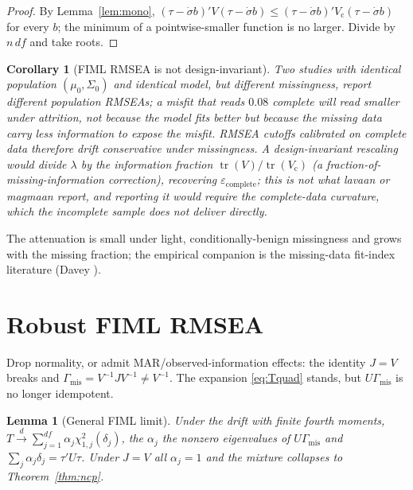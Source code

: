 \documentclass[11pt]{article}
\newcommand{\tr}{\operatorname{tr}}
\newcommand{\Gmis}{\Gamma_{\mathrm{mis}}}
\newcommand{\dto}{\xrightarrow{d}}
\theoremstyle{plain}
\newtheorem{lemma}{Lemma}
\newtheorem{corollary}{Corollary}
\theoremstyle{remark}
\begin{document}
\begin{proof}
By Lemma~\ref{lem:mono}, $(\tau-\dot\sigma b)'V(\tau-\dot\sigma b)\le
(\tau-\dot\sigma b)'V_{\mathrm c}(\tau-\dot\sigma b)$ for every $b$; the minimum
of a pointwise-smaller function is no larger. Divide by $n\,df$ and take roots.
\end{proof}

\begin{corollary}[FIML RMSEA is not design-invariant]\label{cor:noninvariant}
Two studies with identical population $(\mu_0,\Sigma_0)$ and identical model, but
different missingness, report different population RMSEAs; a misfit that reads
$0.08$ complete will read smaller under attrition, not because the model fits
better but because the missing data carry less information to expose the misfit.
RMSEA cutoffs calibrated on complete data therefore drift conservative under
missingness. A design-invariant rescaling would divide $\lambda$ by the
information fraction $\tr(V)/\tr(V_{\mathrm c})$ (a fraction-of-missing-information
correction), recovering $\varepsilon_{\mathrm{complete}}$; this is not what
lavaan or magmaan report, and reporting it would require the complete-data
curvature, which the incomplete sample does not deliver directly.
\end{corollary}

The attenuation is small under light, conditionally-benign missingness and grows
with the missing fraction; the empirical companion is the missing-data fit-index
literature (Davey \cite{davey2005}).

\section{Robust FIML RMSEA}

Drop normality, or admit MAR/observed-information effects: the identity $J=V$
breaks and $\Gmis=V^{-1}JV^{-1}\ne V^{-1}$. The expansion \eqref{eq:Tquad}
stands, but $U\Gmis$ is no longer idempotent.

\begin{lemma}[General FIML limit]\label{lem:mixture}
Under the drift with finite fourth moments,
$T\dto\sum_{j=1}^{df}\alpha_j\chi^2_{1,j}(\delta_j)$, the $\alpha_j$ the nonzero
eigenvalues of $U\Gmis$ and $\sum_j\alpha_j\delta_j=\tau'U\tau$. Under $J=V$ all
$\alpha_j=1$ and the mixture collapses to Theorem~\ref{thm:ncp}.
\end{lemma}
\end{document}
